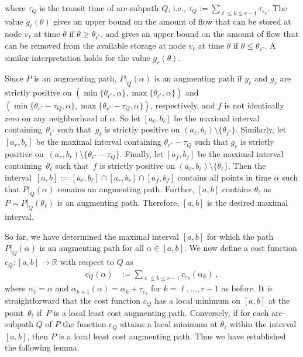 \documentclass{svjour3}                     \smartqed
\newcommand{\rr}{\ensuremath{\mathbb{R}}}
\begin{document}
where $\tau_Q$ is the transit time of arc-subpath $Q$, i.e., $
\tau_Q:=\sum_{\ell\leq k\leq r-1}\tau_{e_k}$. The value $g_\ell(\theta)$ gives an upper bound on the amount of flow that can be stored at node $v_{\ell}$ at time $\theta$ if $\theta\geq \theta_{\ell^*}$, and gives an upper bound on the amount of flow that can be removed from the available storage at node $v_{\ell}$ at time $\theta$ if  $\theta\leq \theta_{\ell^*}$.  A similar interpretation holds for the value $g_r(\theta)$.





Since $P$ is an augmenting path, $P|_Q(\alpha)$ is an augmenting path if $g_\ell$ and $g_r$ are strictly positive on $(\min\{\theta_{\ell^*},\alpha\},\max\{\theta_{\ell^*},\alpha\})$ and  $(\min\{\theta_{r^*}-\tau_Q,\alpha\},\max\{\theta_{r^*}-\tau_Q,\alpha\})$, respectively, and $f$ is not identically zero on any neighborhood of $\alpha$. So let $[a_\ell,b_\ell]$ be the maximal interval containing~$\theta_{\ell^*}$ such that~$g_\ell$ is strictly positive on $(a_\ell,b_\ell)\setminus \{\theta_{\ell^*}\}$. Similarly, let $[a_r,b_r]$ be the maximal interval containing $\theta_{r^*}-\tau_Q$ such that $g_r$ is strictly positive on~$(a_r,b_r)\setminus \{\theta_{r^*}-\tau_Q\}$. Finally, let  $[a_f,b_f]$ be the maximal interval containing~$\theta_{\ell}$ such that~$f$ is strictly positive on $(a_\ell,b_\ell)\setminus \{\theta_{\ell}\}$. Then the interval~${[a,b] := [a_\ell,b_\ell] \cap [a_r,b_r] \cap [a_f,b_f]}$ contains all points in time $\alpha$ such that $P|_Q(\alpha)$ remains an augmenting path. Further, $[a,b]$ contains $\theta_\ell$ as $P=P|_Q(\theta_\ell)$ is an augmenting path. Therefore, $[a,b]$ is the desired maximal interval.


So far, we have determined the maximal interval $[a,b]$ for which the path $P|_Q(\alpha)$ is an augmenting path for all $\alpha\in [a,b]$. We now define a cost function $c_Q:[a,b]\rightarrow \rr$ with respect to $Q$ as
\begin{align}
\label{eq:cost-arc-path}
c_Q(\alpha)&:=\sum_{\ell\leq k\leq r-1}c_{e_k}(\alpha_k)~,
\end{align}
where $\alpha_\ell=\alpha$ and $\alpha_{k+1}(\alpha)=\alpha_{k}+\tau_{e_{k}}$ for $k=\ell,\ldots,r-1$ as before. It is straightforward that the cost function $c_Q$ has a local minimum on $[a,b]$ at the point~$\theta_\ell$ if~$P$ is a local least cost augmenting path. Conversely, if for each arc-subpath $Q$ of $P$ the function $c_{Q}$ attains a local minimum at $\theta_\ell$ within the interval $[a,b]$, then $P$ is a local least cost augmenting path. Thus we have established the following lemma. 
\end{document}
